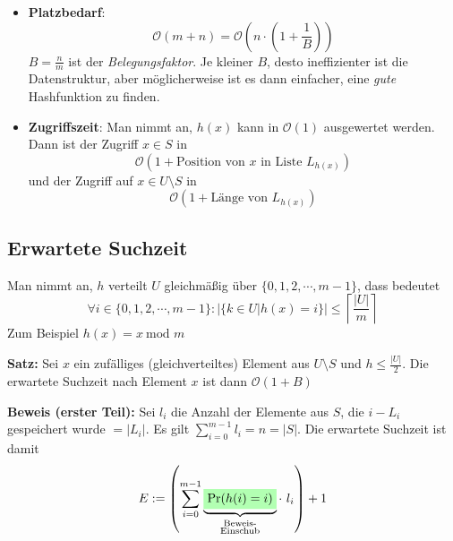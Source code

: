 \documentclass{scrartcl}%
\begin{document}
    \begin{itemize}
        \item \textsf{\textbf{Platzbedarf}}:
        \begin{equation*}
            \mathcal{O}(m+n) =  \mathcal{O}\left(n \cdot \left(1+\frac{1}{B}\right)\right)
        \end{equation*}
        $B=\frac{n}{m}$ ist der \textit{Belegungsfaktor}.
        Je kleiner $B$, desto ineffizienter ist die Datenstruktur, aber möglicherweise ist es dann einfacher, eine \textit{gute} Hashfunktion zu finden.
        \item \textsf{\textbf{Zugriffszeit}}: Man nimmt an, $h(x)$ kann in $\mathcal{O}(1)$ ausgewertet werden.
        Dann ist der Zugriff $x \in S$ in
        \begin{equation*}
            \mathcal{O}(1 + \text{Position von $x$ in Liste } L_{h(x)})
        \end{equation*}
        und der Zugriff auf $x \in U\setminus S$ in
        \begin{equation*}
            \mathcal{O}(1 + \text{Länge von } L_{h(x)})
        \end{equation*}
    \end{itemize}

    \newpage
    \subsection*{Erwartete Suchzeit}\label{subsec:erwarteteSuchzeit}
    Man nimmt an, $h$ verteilt $U$ gleichmäßig über $\{0,1,2,\cdots,m-1 \}$, dass bedeutet
    \begin{equation*}
        \forall i \in \{0,1,2,\cdots,m-1 \}: | \{k \in U | h(x)=i\} | \leq \left\lceil\frac{|U|}{m}\right\rceil
    \end{equation*}
    Zum Beispiel $h(x)=x\ \text{mod } m$

    \vspace*{0.3cm}
    \textbf{\textsf{Satz:}} Sei $x$ ein zufälliges (gleichverteiltes) Element aus $U\setminus S$ und $h \leq \frac{|U|}{2}$.
    Die erwartete Suchzeit nach Element $x$ ist dann $\mathcal{O}(1+B)$

    \vspace*{0.3cm}
    \textbf{\textsf{Beweis (erster Teil):}} Sei $l_i$ die Anzahl der Elemente aus $S$, die $i-L_i$ gespeichert wurde $=|L_i|$.
    Es gilt $\sum_{i=0}^{m-1}l_i=n=|S|$.
    Die erwartete Suchzeit ist damit
    \begin{equation*}
        E:=\left(\sum_{i=0}^{m-1}\underbrace{\colorbox{green!30}{$\text{Pr}(h(i)=i)$}}_{\substack{\text{Beweis-} \\ \text{Einschub}}} \cdot\ l_i\right) + 1
    \end{equation*}
\end{document}
